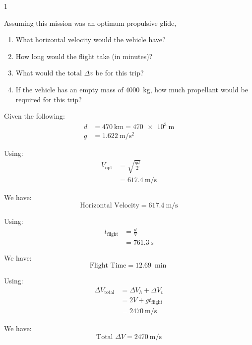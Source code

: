 \begin{hwkProblem*}{1}{} \label{hwk:p01}

	Assuming this mission was an optimum propulsive glide,
	\begin{enumerate}[label=\alph*.]
		\item \label{hwk:p01a} What horizontal velocity would the vehicle have?
		\item \label{hwk:p01b} How long would the flight take (in minutes)?
		\item \label{hwk:p01c} What would the total \( \Delta v \) be for this trip?
		\item \label{hwk:p01d} If the vehicle has an empty mass of \qty{4000}{\kg}, how much propellant would be required for this trip?
	\end{enumerate}

	\hwkSol{} \label{hwk:s01}

	Given the following:
	\begin{align*}
		d &= \qty{470}{\km} = \qty{470e3}{\m} \\
		g &= \qty{1.622}{\m\per\s\squared}
	\end{align*}

	\hwkPart{} \label{hwk:s01a}

	Using:
	\begin{align*}
		V_{\text{opt}} &= \sqrt{\frac{gd}{2}} \\
		\, &= \qty{617.4}{\m\per\s}
	\end{align*}

	We have:
	\[
		\boxed{\text{Horizontal Velocity} = \qty{617.4}{\m\per\s}}
	\]

	\hwkPart{} \label{hwk:s01b}

	Using:
	\begin{align*}
		t_{\text{flight}} &= \frac{d}{V} \\
		\, &= \qty{761.3}{\s}
	\end{align*}

	We have:
	\[
		\boxed{\text{Flight Time} = \qty{12.69}{\min}}
	\]

	\hwkPart{} \label{hwk:s01c}

	Using:
	\begin{align*}
		\Delta V_{\text{total}} &= \Delta V_{h} + \Delta V_{v} \\
		\, &= 2 V + g t_{\text{flight}} \\
		\, &= \qty{2470}{\m\per\s}
	\end{align*}

	We have:
	\[
		\boxed{\text{Total } \Delta V = \qty{2470}{\m\per\s}}
	\]


\end{hwkProblem*}
